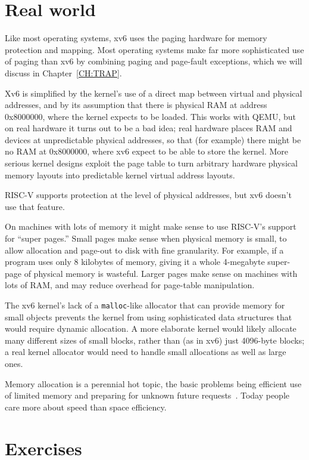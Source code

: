 \section{Real world}

Like most operating systems, xv6 uses the paging hardware for memory
protection and mapping.  Most operating systems make far more
sophisticated use of paging than xv6 by combining paging and
page-fault exceptions, which we will discuss in
Chapter~\ref{CH:TRAP}.

Xv6 is simplified by the kernel's use of a direct map between virtual
and physical addresses, and by its assumption that there is physical
RAM at address 0x8000000, where the kernel expects to be loaded. This
works with QEMU, but on real hardware it turns out to be a bad idea;
real hardware places RAM and devices at unpredictable physical
addresses, so that (for example) there might be no RAM at 0x8000000,
where xv6 expect to be able to store the kernel. More serious kernel
designs exploit the page table to turn arbitrary hardware physical
memory layouts into predictable kernel virtual address layouts.

RISC-V supports protection at the level of physical addresses,
but xv6 doesn't use that feature.

On machines with lots of memory
it might make sense to use
RISC-V's support for ``super pages.''
Small pages make sense
when physical memory is small, to allow allocation and page-out to disk
with fine granularity.
For example, if a program
uses only 8 kilobytes of memory, giving it a whole 4-megabyte super-page
of physical memory is wasteful.
Larger pages make sense on machines with lots of RAM,
and may reduce overhead for page-table manipulation.

The xv6 kernel's lack of a {\tt malloc}-like allocator that can
provide memory for small objects prevents the kernel from using
sophisticated data structures that would require dynamic allocation.
A more elaborate kernel
would likely allocate many different sizes of small blocks,
rather than (as in xv6) just 4096-byte blocks;
a real kernel
allocator would need to handle small allocations as well as large
ones.

Memory allocation is a perennial hot topic, the basic problems being
efficient use of limited memory and
preparing for unknown future requests~\cite{knuth}.  Today people care more about speed than
space efficiency.
\section{Exercises}

